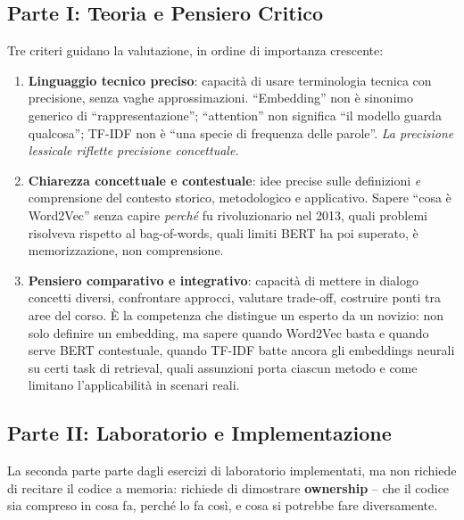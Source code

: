 \documentclass[12pt,a4paper]{article}
\begin{document}
\subsection{Parte I: Teoria e Pensiero Critico}

Tre criteri guidano la valutazione, in ordine di importanza crescente:

\begin{enumerate}
  \item \textbf{Linguaggio tecnico preciso}: capacit\`a di usare terminologia tecnica con precisione, senza vaghe approssimazioni. ``Embedding'' non \`e sinonimo generico di ``rappresentazione''; ``attention'' non significa ``il modello guarda qualcosa''; TF-IDF non \`e ``una specie di frequenza delle parole''. \emph{La precisione lessicale riflette precisione concettuale.}
  \item \textbf{Chiarezza concettuale e contestuale}: idee precise sulle definizioni \emph{e} comprensione del contesto storico, metodologico e applicativo. Sapere ``cosa \`e Word2Vec'' senza capire \emph{perch\'e} fu rivoluzionario nel 2013, quali problemi risolveva rispetto al bag-of-words, quali limiti BERT ha poi superato, \`e memorizzazione, non comprensione.
  \item \textbf{Pensiero comparativo e integrativo}: capacit\`a di mettere in dialogo concetti diversi, confrontare approcci, valutare trade-off, costruire ponti tra aree del corso. \`E la competenza che distingue un esperto da un novizio: non solo definire un embedding, ma sapere quando Word2Vec basta e quando serve BERT contestuale, quando TF-IDF batte ancora gli embeddings neurali su certi task di retrieval, quali assunzioni porta ciascun metodo e come limitano l'applicabilit\`a in scenari reali.
\end{enumerate}

\subsection{Parte II: Laboratorio e Implementazione}

La seconda parte parte dagli esercizi di laboratorio implementati, ma non richiede di recitare il codice a memoria: richiede di dimostrare \textbf{ownership} -- che il codice sia compreso in cosa fa, perch\'e lo fa cos\`i, e cosa si potrebbe fare diversamente.
\end{document}
